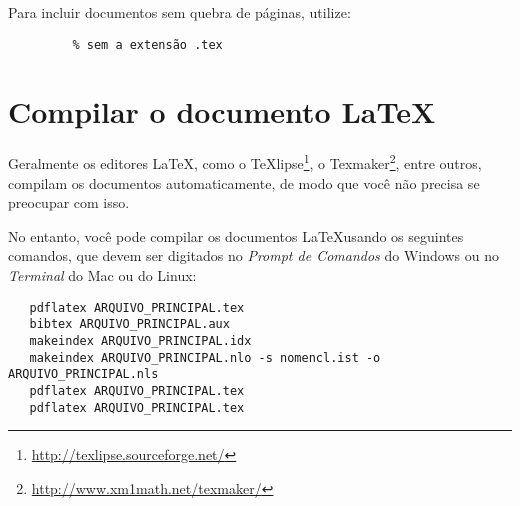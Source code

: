 Para incluir documentos sem quebra de páginas, utilize:
\begin{verbatim}
         % sem a extensão .tex
\end{verbatim}


\section{Compilar o documento \LaTeX}

Geralmente os editores \LaTeX, como o TeXlipse\footnote{\url{http://texlipse.sourceforge.net/}}, o Texmaker\footnote{\url{http://www.xm1math.net/texmaker/}}, entre outros, compilam os documentos automaticamente, de modo que você não precisa se preocupar com isso.

No entanto, você pode compilar os documentos \LaTeX usando os seguintes comandos, que devem ser digitados no \emph{Prompt de Comandos} do Windows ou no \emph{Terminal} do Mac ou do Linux:
\begin{verbatim}
   pdflatex ARQUIVO_PRINCIPAL.tex
   bibtex ARQUIVO_PRINCIPAL.aux
   makeindex ARQUIVO_PRINCIPAL.idx
   makeindex ARQUIVO_PRINCIPAL.nlo -s nomencl.ist -o ARQUIVO_PRINCIPAL.nls
   pdflatex ARQUIVO_PRINCIPAL.tex
   pdflatex ARQUIVO_PRINCIPAL.tex
\end{verbatim}
